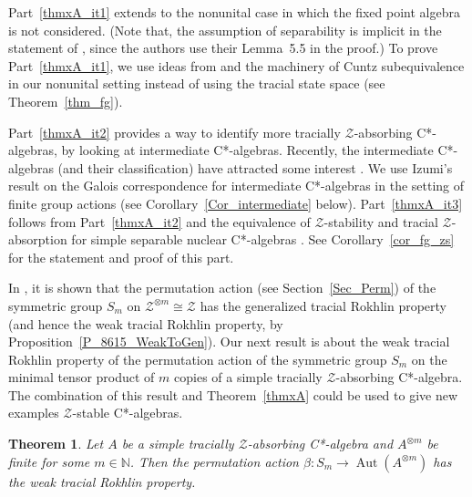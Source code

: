 \documentclass[11pt]{amsart}
\theoremstyle{plain}
\newtheorem{thmx}{Theorem}
\theoremstyle{definition}
\theoremstyle{remark}
\numberwithin{equation}{section}
\newcommand{\N}{\mathbb{N}}
\newcommand{\bt}{\beta}
\newcommand{\Aut}{{\operatorname{Aut}}}
\begin{document}
Part~\eqref{thmxA_it1} extends \cite[Theorem~5.6]{HO13} to
the nonunital case in which  the fixed point algebra is not considered.
 (Note that, the assumption of separability
is implicit in the statement of \cite[Theorem~5.6]{HO13}, since the 
authors use their Lemma~5.5 in the proof.) 
To prove Part~\eqref{thmxA_it1}, we use ideas from \cite{HO13} 
and the machinery of
 Cuntz subequivalence in our nonunital setting
instead of using the tracial state space (see Theorem~\ref{thm_fg}).

  Part~\eqref{thmxA_it2} provides a way to identify more tracially 
  $\mathcal{Z}$-absorbing C*-algebras, by looking at intermediate C*-algebras.
  Recently, the intermediate C*-algebras
  (and their classification) have attracted some interest \cite{ER2021, AK2020}.
  We use Izumi's result on  the Galois correspondence for
  intermediate C*-algebras in the setting of finite group actions
  \cite[Corollary~6.6]{Izumi2002} 
  (see Corollary~\ref{Cor_intermediate} below). 
  Part~\eqref{thmxA_it3} follows from Part~\eqref{thmxA_it2}
  and the equivalence of $\mathcal{Z}$-stability and tracial $\mathcal{Z}$-absorption
 for simple separable nuclear C*-algebras \cite{HO13, CLS2021}.
 See Corollary~\ref{cor_fg_zs} for the statement and proof of this part.
 
 \medskip
 
 In \cite{HO13}, it is shown that the permutation action (see Section~\ref{Sec_Perm})
 of the symmetric group $S_m$ on  
 $\mathcal{Z}^{\otimes m}\cong \mathcal{Z}$
 has the generalized tracial Rokhlin property
 (and hence the weak tracial Rokhlin property, by Proposition~\ref{P_8615_WeakToGen}).
 Our next result is about the weak tracial 
 Rokhlin property of the permutation action
 of the symmetric group $S_m$ on the
  minimal tensor product of $m$ copies of
  a simple tracially $\mathcal{Z}$-absorbing C*-algebra.
  The combination of this result and Theorem~\ref{thmxA} 
  could be used to give new examples $\mathcal{Z}$-stable C*-algebras.
  
\begin{thmx}\label{thmxB}
Let $A$
be a simple tracially $\mathcal{Z}$-absorbing C*-algebra and 
$A^{\otimes m}$ be finite for some $m \in \N$.
Then the permutation action $\bt \colon S_m \to \Aut (A^{\otimes m})$
has the weak tracial Rokhlin property.
\end{thmx}
\end{document}
